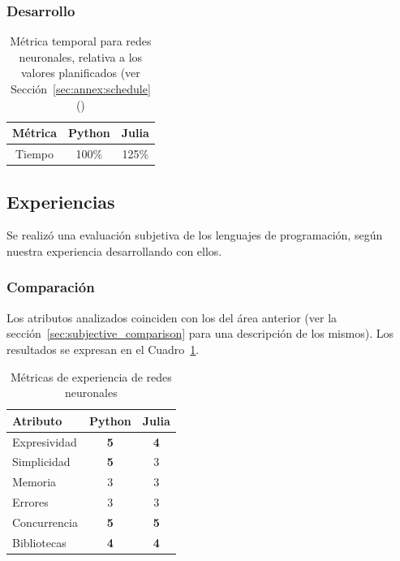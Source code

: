 \documentclass[11pt]{article}
\let\Oldsubsection\subsection
\renewcommand{\subsection}{\FloatBarrier\Oldsubsection}
\let\Oldsubsubsection\subsubsection
\renewcommand{\subsubsection}{\FloatBarrier\Oldsubsubsection}
\newcommand{\goodMetric}[1]{{\textbf{#1}}}
\begin{document}
\subsubsection{Desarrollo}

\begin{table}[H]
\centering
\begin{tabular}{|c|c|c|}
\hline
Métrica & Python & Julia \\ \hline
Tiempo & 100\% & 125\% \\ \hline
\end{tabular}
\caption{Métrica temporal para redes neuronales, relativa a los valores planificados (ver Sección~\ref{sec:annex:schedule} ()}
\end{table}

\subsection{Experiencias}

Se realizó una evaluación subjetiva de los lenguajes de programación, según nuestra experiencia desarrollando con ellos.

\subsubsection{Comparación}

Los atributos analizados coinciden con los del área anterior (ver la sección~\ref{sec:subjective_comparison} para una descripción de los mismos).
Los resultados se expresan en el Cuadro~\ref{tab:nn:experiences}.

\begin{table}[h]
\centering
\begin{tabular}{|l|cc|}
\hline
Atributo & \multicolumn{1}{c|}{Python} & Julia \\ \hline
Expresividad & \multicolumn{1}{c|}{\goodMetric{5}} & \goodMetric{4} \\ \hline
Simplicidad & \multicolumn{1}{c|}{\goodMetric{5}} & 3 \\ \hline
Memoria & \multicolumn{1}{c|}{3} & 3 \\ \hline
Errores & \multicolumn{1}{c|}{3} & 3 \\ \hline
Concurrencia & \multicolumn{1}{c|}{\goodMetric{5}} & \goodMetric{5} \\ \hline
Bibliotecas & \multicolumn{1}{c|}{\goodMetric{4}} & \goodMetric{4} \\ \hline
\end{tabular}
\caption{Métricas de experiencia de redes neuronales}
\label{tab:nn:experiences}
\end{table}
\end{document}
